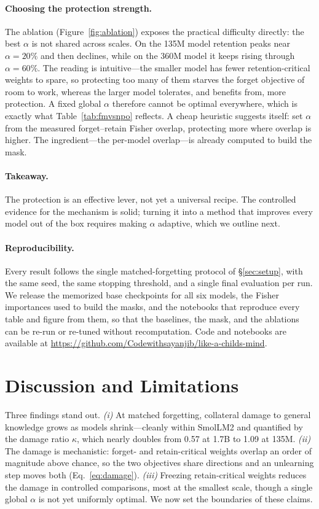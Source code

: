 \documentclass[sigconf,nonacm]{acmart}
\begin{document}
\paragraph{Choosing the protection strength.} The ablation (Figure~\ref{fig:ablation}) exposes the practical difficulty directly: the best $\alpha$ is not shared across scales. On the 135M model retention peaks near $\alpha{=}20\%$ and then declines, while on the 360M model it keeps rising through $\alpha{=}60\%$. The reading is intuitive---the smaller model has fewer retention-critical weights to spare, so protecting too many of them starves the forget objective of room to work, whereas the larger model tolerates, and benefits from, more protection. A fixed global $\alpha$ therefore cannot be optimal everywhere, which is exactly what Table~\ref{tab:fmvsnpo} reflects. A cheap heuristic suggests itself: set $\alpha$ from the measured forget--retain Fisher overlap, protecting more where overlap is higher. The ingredient---the per-model overlap---is already computed to build the mask.

\paragraph{Takeaway.} The protection is an effective lever, not yet a universal recipe. The controlled evidence for the mechanism is solid; turning it into a method that improves every model out of the box requires making $\alpha$ adaptive, which we outline next.

\paragraph{Reproducibility.} Every result follows the single matched-forgetting protocol of \S\ref{sec:setup}, with the same seed, the same stopping threshold, and a single final evaluation per run. We release the memorized base checkpoints for all six models, the Fisher importances used to build the masks, and the notebooks that reproduce every table and figure from them, so that the baselines, the mask, and the ablations can be re-run or re-tuned without recomputation. Code and notebooks are available at \url{https://github.com/Codewithsayanjib/like-a-childs-mind}.

\section{Discussion and Limitations}
Three findings stand out. \emph{(i)} At matched forgetting, collateral damage to general knowledge grows as models shrink---cleanly within SmolLM2 and quantified by the damage ratio $\kappa$, which nearly doubles from 0.57 at 1.7B to 1.09 at 135M. \emph{(ii)} The damage is mechanistic: forget- and retain-critical weights overlap an order of magnitude above chance, so the two objectives share directions and an unlearning step moves both (Eq.~\eqref{eq:damage}). \emph{(iii)} Freezing retain-critical weights reduces the damage in controlled comparisons, most at the smallest scale, though a single global $\alpha$ is not yet uniformly optimal. We now set the boundaries of these claims.
\end{document}
